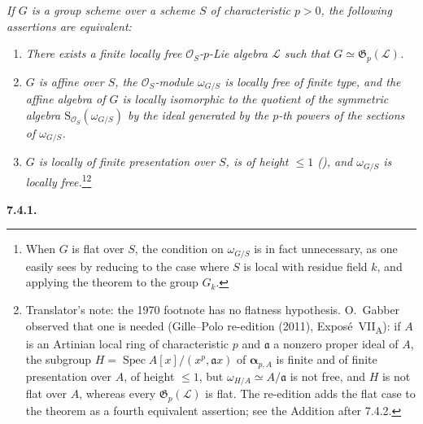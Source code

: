 \textit{If \(G\) is a group scheme over a scheme \(S\) of
characteristic \(p>0\), the following assertions are
equivalent:}
\begin{enumerate}
  \item[\textit{\SGAInlineRefTarget{sga3:VIIA:7.4-theorem:item:i}(i)}]
  \textit{There exists a finite locally free
  \(\mathcal O_S\)-\(p\)-Lie algebra \(\mathcal L\) such that
  \(G\simeq\mathfrak G_p(\mathcal L)\).}

  \item[\textit{(ii)}]
  \textit{\(G\) is affine over \(S\), the
  \(\mathcal O_S\)-module \(\omega_{G/S}\) is locally free of
  finite type, and the affine algebra of \(G\) is locally
  isomorphic to the quotient of the symmetric algebra
  \(\mathrm S_{\mathcal O_S}(\omega_{G/S})\) by the ideal
  generated by the \(p\)-th powers of the sections of
  \(\omega_{G/S}\).}

  \item[\textit{\SGAInlineRefTarget{sga3:VIIA:7.4-theorem:item:iii}(iii)}]
  \textit{\(G\) is locally of finite presentation over \(S\),
  is of height \(\leq1\) \textup{()}, and \(\omega_{G/S}\) is locally free.}\footnote{When \(G\) is flat over \(S\), the
  condition on \(\omega_{G/S}\) is in fact unnecessary, as one easily sees
  by reducing to the case where \(S\) is local with residue field \(k\),
  and applying the theorem to the group \(G_k\).}\footnote{Translator's
  note: the 1970 footnote has no flatness hypothesis. O.~Gabber observed
  that one is needed (Gille--Polo re-edition (2011),
  Expos\'e~VII\textsubscript{A}): if \(A\) is an Artinian local ring of
  characteristic \(p\) and \(\mathfrak a\) a nonzero proper ideal of \(A\),
  the subgroup \(H=\operatorname{Spec}A[x]/(x^p,\mathfrak ax)\) of
  \(\boldsymbol\alpha_{p,A}\) is finite and of finite presentation over
  \(A\), of height \(\leq1\), but \(\omega_{H/A}\simeq A/\mathfrak a\) is
  not free, and \(H\) is not flat over \(A\), whereas every
  \(\mathfrak G_p(\mathcal L)\) is flat. The re-edition adds the flat case
  to the theorem as a fourth equivalent assertion; see the Addition after
  7.4.2.}
\end{enumerate}

\medskip
\noindent\textbf{7.4.1.}
\label{sga3:VIIA:7.4.1}

